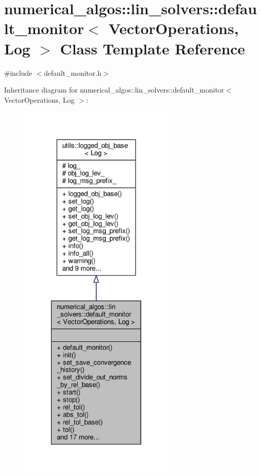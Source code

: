 \hypertarget{classnumerical__algos_1_1lin__solvers_1_1default__monitor}{\section{numerical\-\_\-algos\-:\-:lin\-\_\-solvers\-:\-:default\-\_\-monitor$<$ Vector\-Operations, Log $>$ Class Template Reference}
\label{classnumerical__algos_1_1lin__solvers_1_1default__monitor}
}


{\ttfamily \#include $<$default\-\_\-monitor.\-h$>$}



Inheritance diagram for numerical\-\_\-algos\-:\-:lin\-\_\-solvers\-:\-:default\-\_\-monitor$<$ Vector\-Operations, Log $>$\-:\nopagebreak
\begin{figure}[H]
\begin{center}
\leavevmode
\includegraphics[width=212pt]{classnumerical__algos_1_1lin__solvers_1_1default__monitor__inherit__graph}
\end{center}
\end{figure}


